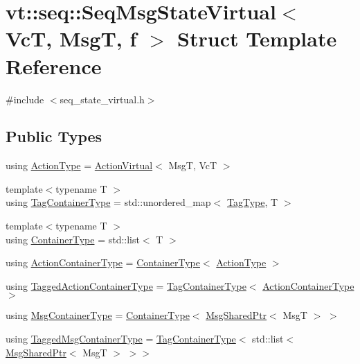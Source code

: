 \hypertarget{structvt_1_1seq_1_1_seq_msg_state_virtual}{}\section{vt\+:\+:seq\+:\+:Seq\+Msg\+State\+Virtual$<$ VcT, MsgT, f $>$ Struct Template Reference}
\label{structvt_1_1seq_1_1_seq_msg_state_virtual}


{\ttfamily \#include $<$seq\+\_\+state\+\_\+virtual.\+h$>$}

\subsection*{Public Types}
\begin{DoxyCompactItemize}
\item 
using \hyperlink{structvt_1_1seq_1_1_seq_msg_state_virtual_a9b86c445166e8484a5e275caf8a22f8c}{Action\+Type} = \hyperlink{structvt_1_1seq_1_1_action_virtual}{Action\+Virtual}$<$ MsgT, VcT $>$
\item 
{\footnotesize template$<$typename T $>$ }\\using \hyperlink{structvt_1_1seq_1_1_seq_msg_state_virtual_a64d396aacb60dcc361f846d807bd074a}{Tag\+Container\+Type} = std\+::unordered\+\_\+map$<$ \hyperlink{namespacevt_a84ab281dae04a52a4b243d6bf62d0e52}{Tag\+Type}, T $>$
\item 
{\footnotesize template$<$typename T $>$ }\\using \hyperlink{structvt_1_1seq_1_1_seq_msg_state_virtual_a271216687b589ec1d08d4da5cdbb5177}{Container\+Type} = std\+::list$<$ T $>$
\item 
using \hyperlink{structvt_1_1seq_1_1_seq_msg_state_virtual_aa60e119bc842980c949be50663b04b7a}{Action\+Container\+Type} = \hyperlink{structvt_1_1seq_1_1_seq_msg_state_virtual_a271216687b589ec1d08d4da5cdbb5177}{Container\+Type}$<$ \hyperlink{structvt_1_1seq_1_1_seq_msg_state_virtual_a9b86c445166e8484a5e275caf8a22f8c}{Action\+Type} $>$
\item 
using \hyperlink{structvt_1_1seq_1_1_seq_msg_state_virtual_a1298c226eeddc2e8fbd58bf1b92ef2aa}{Tagged\+Action\+Container\+Type} = \hyperlink{structvt_1_1seq_1_1_seq_msg_state_virtual_a64d396aacb60dcc361f846d807bd074a}{Tag\+Container\+Type}$<$ \hyperlink{structvt_1_1seq_1_1_seq_msg_state_virtual_aa60e119bc842980c949be50663b04b7a}{Action\+Container\+Type} $>$
\item 
using \hyperlink{structvt_1_1seq_1_1_seq_msg_state_virtual_a04ba59629edd91369fb4dcb17784c370}{Msg\+Container\+Type} = \hyperlink{structvt_1_1seq_1_1_seq_msg_state_virtual_a271216687b589ec1d08d4da5cdbb5177}{Container\+Type}$<$ \hyperlink{namespacevt_ab2b3d506ec8e8d1540aede826d84a239}{Msg\+Shared\+Ptr}$<$ MsgT $>$ $>$
\item 
using \hyperlink{structvt_1_1seq_1_1_seq_msg_state_virtual_a9760353cffc9071f3e24054562a86db3}{Tagged\+Msg\+Container\+Type} = \hyperlink{structvt_1_1seq_1_1_seq_msg_state_virtual_a64d396aacb60dcc361f846d807bd074a}{Tag\+Container\+Type}$<$ std\+::list$<$ \hyperlink{namespacevt_ab2b3d506ec8e8d1540aede826d84a239}{Msg\+Shared\+Ptr}$<$ MsgT $>$ $>$$>$
\end{DoxyCompactItemize}
